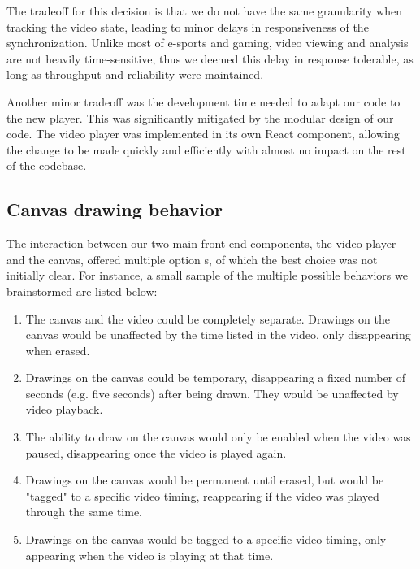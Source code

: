 \documentclass[conference]{IEEEtran}
\begin{document}
  The tradeoff for this decision is that we do not have the same granularity when tracking the video state, leading to minor delays in responsiveness of the synchronization. Unlike most of e-sports and gaming, video viewing and analysis are not heavily time-sensitive, thus we deemed this delay in response tolerable, as long as throughput and reliability were maintained.

  Another minor tradeoff was the development time needed to adapt our code to the new player. This was significantly mitigated by the modular design of our code. The video player was implemented in its own React component, allowing the change to be made quickly and efficiently with almost no impact on the rest of the codebase.

\subsection{Canvas drawing behavior}

  The interaction between our two main front-end components, the video player and the canvas, offered multiple option
s, of which the best choice was not initially clear. For instance, a small sample of the multiple possible behaviors we brainstormed are listed below:

  \begin{enumerate}
    \item The canvas and the video could be completely separate. Drawings on the canvas would be unaffected by the time listed in the video, only disappearing when erased.

    \item Drawings on the canvas could be temporary, disappearing a fixed number of seconds (e.g. five seconds) after being drawn. They would be unaffected by video playback.

    \item The ability to draw on the canvas would only be enabled when the video was paused, disappearing once the video is played again.

    \item Drawings on the canvas would be permanent until erased, but would be "tagged" to a specific video timing, reappearing if the video was played through the same time.

    \item Drawings on the canvas would be tagged to a specific video timing, only appearing when the video is playing at that time.
  \end{enumerate}
\end{document}
